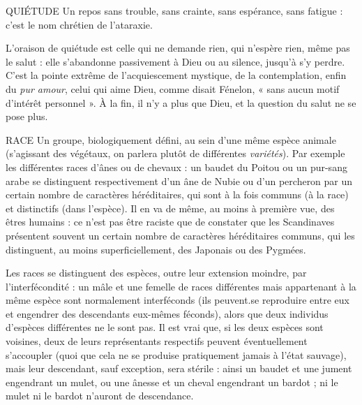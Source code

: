 QUIÉTUDE Un repos sans trouble, sans crainte, sans espérance, sans fatigue :
c’est le nom chrétien de l’ataraxie.

L’oraison de quiétude est celle qui ne demande rien, qui n’espère rien,
même pas le salut : elle s’abandonne passivement à Dieu ou au silence, jusqu’à
s’y perdre. C’est la pointe extrême de l’acquiescement mystique, de la contemplation,
enfin du {\it pur amour}, celui qui aime Dieu, comme disait Fénelon, « sans
aucun motif d'intérêt personnel ». À la fin, il n’y a plus que Dieu, et la question
du salut ne se pose plus.

RACE Un groupe, biologiquement défini, au sein d’une même espèce animale
(s'agissant des végétaux, on parlera plutôt de différentes
{\it variétés}). Par exemple les différentes races d’ânes ou de chevaux : un baudet du
Poitou ou un pur-sang arabe se distinguent respectivement d’un âne de Nubie
ou d’un percheron par un certain nombre de caractères héréditaires, qui sont à
la fois communs (à la race) et distinctifs (dans l’espèce). Il en va de même, au
moins à première vue, des êtres humains : ce n’est pas être raciste que de constater
que les Scandinaves présentent souvent un certain nombre de caractères
héréditaires communs, qui les distinguent, au moins superficiellement, des
Japonais ou des Pygmées.

Les races se distinguent des espèces, outre leur extension moindre, par
l’interfécondité : un mâle et une femelle de races différentes mais appartenant
à la même espèce sont normalement interféconds (ils peuvent.se reproduire
entre eux et engendrer des descendants eux-mêmes féconds), alors que deux
individus d’espèces différentes ne le sont pas. Il est vrai que, si les deux espèces
sont voisines, deux de leurs représentants respectifs peuvent éventuellement
s’accoupler (quoi que cela ne se produise pratiquement jamais à l’état sauvage),
mais leur descendant, sauf exception, sera stérile : ainsi un baudet et une
jument engendrant un mulet, ou une ânesse et un cheval engendrant un
bardot ; ni le mulet ni le bardot n’auront de descendance.

